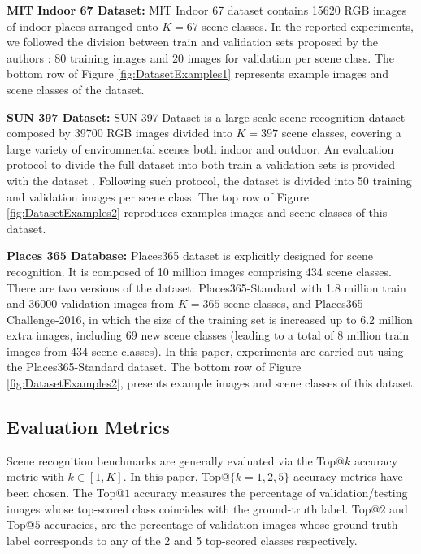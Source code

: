 \documentclass[review, 3p, sort&compress]{elsarticle}
\begin{document}
\textbf{MIT Indoor 67 Dataset:} MIT Indoor 67 dataset \cite{quattoni2009recognizing} contains 15620 RGB images of indoor places arranged onto \(K = 67\) scene classes. In the reported experiments, we followed the division between train and validation sets proposed by the authors \cite{quattoni2009recognizing}: 80 training images and 20 images for validation per scene class. The bottom row of Figure \ref{fig:DatasetExamples1} represents example images and scene classes of the dataset.

\textbf{SUN 397 Dataset:} SUN 397 Dataset \cite{xiao2010sun} is a large-scale scene recognition dataset composed by 39700 RGB images divided into \(K = 397\) scene classes, covering a large variety of environmental scenes both indoor and outdoor. An evaluation protocol to divide the full dataset into both train a validation sets is provided with the dataset \cite{xiao2010sun}. Following such protocol, the dataset is divided into 50 training and validation images per scene class. The top row of Figure \ref{fig:DatasetExamples2} reproduces examples images and scene classes of this dataset.

\textbf{Places 365 Database:} Places365 dataset \cite{zhou2018places} is explicitly designed for scene recognition. It is composed of 10 million images comprising 434 scene classes. There are two versions of the dataset: Places365-Standard with 1.8 million train and 36000 validation images from \(K=365\) scene classes, and Places365-Challenge-2016, in which the size of the training set is increased up to 6.2 million extra images, including 69 new scene classes (leading to a total of 8 million train images from 434 scene classes). In this paper, experiments are carried out using the Places365-Standard dataset. The bottom row of Figure \ref{fig:DatasetExamples2}, presents example images and scene classes of this dataset.

\subsection{Evaluation Metrics}
Scene recognition benchmarks are generally evaluated via the Top@\(k\) accuracy metric with \(k \in [1, K]\). In this paper, Top@\(\lbrace k=1,2,5 \rbrace\) accuracy metrics have been chosen. The Top@\(1\) accuracy measures the percentage of validation/testing images whose top-scored class coincides with the ground-truth label. Top@\(2\) and Top@\(5\) accuracies, are the percentage of validation images whose ground-truth label corresponds to any of the 2 and 5 top-scored classes respectively.
\end{document}

